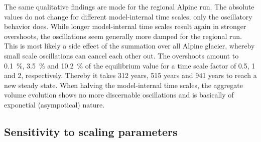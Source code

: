       The same qualitative findings are made for the regional Alpine run. The absolute values do not change for different model-internal time scales, only the oscillatory behavior does. While longer model-internal time scales result again in stronger overshoots, the oscillations seem generally more damped for the regional run. This is most likely a side effect of the summation over all Alpine glacier, whereby small scale oscillations can cancel each other out. The overshoots amount to \SI{0.1}{\percent}, \SI{3.5}{\percent} and \SI{10.2}{\percent} of the equilibrium value for a time scale factor of 0.5, 1 and 2, respectively. Thereby it takes 312 years, 515 years and 941 years to reach a new steady state. When halving the model-internal time scales, the aggregate volume evolution shows no more discernable oscillations and is basically of exponetial (asympotical) nature.


    \subsection{Sensitivity to scaling parameters} %
    \label{sec:sensitivity_to_scaling_parameters_results}

